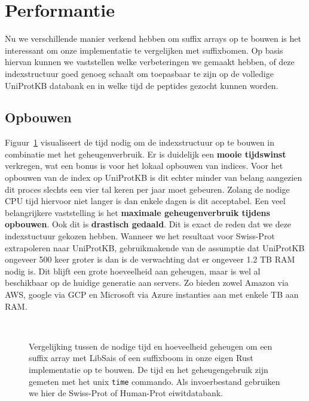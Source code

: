 \section{Performantie}\label{sec:performantie}
Nu we verschillende manier verkend hebben om suffix arrays op te bouwen is het interessant om onze implementatie te vergelijken met suffixbomen.
Op basis hiervan kunnen we vaststellen welke verbeteringen we gemaakt hebben, of deze indexstructuur goed genoeg schaalt om toepasbaar te zijn op de volledige UniProtKB databank en in welke tijd de peptides gezocht kunnen worden.

\subsection{Opbouwen}
Figuur~\ref{fig:array_building} visualiseert de tijd nodig om de indexstructuur op te bouwen in combinatie met het geheugenverbruik.
Er is duidelijk een \textbf{mooie tijdswinst} verkregen, wat een bonus is voor het lokaal opbouwen van indices.
Voor het opbouwen van de index op UniProtKB is dit echter minder van belang aangezien dit proces slechts een vier tal keren per jaar moet gebeuren.
Zolang de nodige CPU tijd hiervoor niet langer is dan enkele dagen is dit acceptabel.
Een veel belangrijkere vaststelling is het \textbf{maximale geheugenverbruik tijdens opbouwen}.
Ook dit is \textbf{drastisch gedaald}.
Dit is exact de reden dat we deze indexstuctuur gekozen hebben.
Wanneer we het resultaat voor Swiss-Prot extrapoleren naar UniProtKB, gebruikmakende van de assumptie dat UniProtKB ongeveer 500 keer groter is dan is de verwachting dat er ongeveer 1.2 TB RAM nodig is.
Dit blijft een grote hoeveelheid aan geheugen, maar is wel al beschikbaar op de huidige generatie aan servers.
Zo bieden zowel Amazon via AWS, google via GCP en Microsoft via Azure instanties aan met enkele TB aan RAM\@.

\begin{figure}[H]
    \centering
    \\[4ex] %

    \caption{Vergelijking tussen de nodige tijd en hoeveelheid geheugen om een suffix array met LibSais of een suffixboom in onze eigen Rust implementatie op te bouwen. De tijd en het geheugengebruik zijn gemeten met het unix \texttt{time} commando. Als invoerbestand gebruiken we hier de Swiss-Prot of Human-Prot eiwitdatabank.}\label{fig:array_building}
\end{figure}

